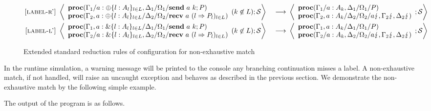 \documentclass[12pt, openany]{memoir}
\newcommand*{\send}[2]{\textbf{send}\ #1\ #2}
\newcommand*{\recv}[2]{\textbf{recv}\ #1\ #2}
\newcommand*{\cancel}[1]{#1 \lightning}
\newcommand*{\procObj}[4]{\textbf{proc}(#1/#2/#3/#4)}
\newcommand*{\cancelSet}[0]{\mathcal{S}}
\begin{document}
\begin{figure}[H]
  \begin{alignat}{4}
    \label{label-reduction-r'} \textsc{[label-r']} & ~ 
      \Braket{
        \begin{array}{l}
          \procObj{\Gamma_1}{a : \oplus\{l : A_l\}_{l \in L}, \Delta_1}{\Omega_1}{\send{a}{k}; P} \\
          \procObj{\Gamma_2, a : \oplus\{l : A_l\}_{l \in L}}{\Delta_2}{\Omega_2}{\recv{a}{(l \Rightarrow P_l)_{l \in L}}}
        \end{array}
        (k \not\in L)
        ; \cancelSet
      } & ~ \longrightarrow & ~ 
      \Braket{
        \begin{array}{l}
          \procObj{\Gamma_1}{a : A_k, \Delta_1}{\Omega_1}{P} \\
          \procObj{\Gamma_2, a : A_k}{\Delta_2}{\Omega_2}{\cancel{a}, \cancel{\Gamma_2}, \cancel{\Delta_2}}
        \end{array}
        ; \cancelSet
    } \tag*{} \\
    \label{label-reduction-l'} \textsc{[label-l']} & ~ 
      \Braket{
        \begin{array}{l}
          \procObj{\Gamma_1, a : \&\{l : A_l\}_{l \in L}}{\Delta_1}{\Omega_1}{\send{a}{k}; P} \\
          \procObj{\Gamma_2}{a : \&\{l : A_l\}_{l \in L}, \Delta_2}{\Omega_2}{\recv{a}{(l \Rightarrow P_l)_{l \in L}}}
        \end{array}
        (k \not\in L)
        ; \cancelSet
      } & ~ \longrightarrow & ~ 
      \Braket{
        \begin{array}{l}
          \procObj{\Gamma_1, a : A_k}{\Delta_1}{\Omega_1}{P} \\
          \procObj{\Gamma_2}{a : A_k, \Delta_2}{\Omega_2}{\cancel{a}, \cancel{\Gamma_2}, \cancel{\Delta_2}}
        \end{array}
        ; \cancelSet
    } \tag*{}
  \end{alignat}
  \raggedleft
  \caption{Extended standard reduction rules of configuration for non-exhaustive match}
  \label{fig:nonexreduction}
\end{figure}
In the runtime simulation, a warning message will be printed to the console any branching continuation misses a label.
A non-exhaustive match, if not handled, will raise an uncaught exception and behaves as described in the previous section.
We demonstrate the non-exhaustive match by the following simple example.

The output of the program is as follows.
\end{document}
